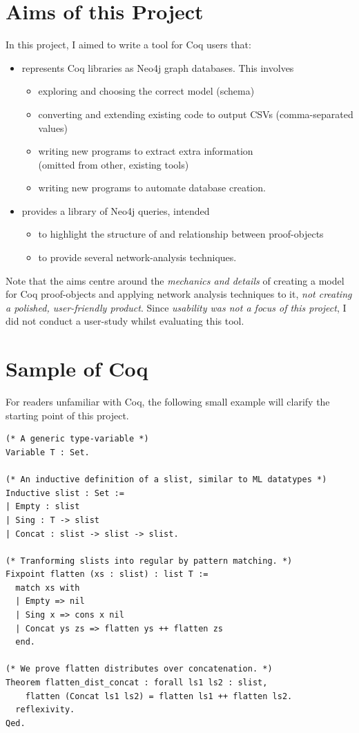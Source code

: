 \section{Aims of this Project}\label{intro:aims}

In this project, I aimed to write a tool for Coq users that:

\begin{itemize}
\item represents Coq libraries as Neo4j graph databases. This involves
  \begin{itemize}
    \item exploring and choosing the correct model (schema)
  \item converting and extending existing code to output CSVs (comma-separated values)
  \item writing new programs to extract extra information \\
      (omitted from other, existing tools)
  \item writing new programs to automate database creation.
  \end{itemize}

\item provides a library of Neo4j queries, intended
  \begin{itemize}
  \item to highlight the structure of and relationship between proof-objects
  \item to provide several network-analysis techniques.
  \end{itemize}
\end{itemize}

Note that the aims centre around the \emph{mechanics and details} of creating a
model for Coq proof-objects and applying network analysis techniques to it,
\emph{not creating a polished, user-friendly product}. Since \emph{usability was
not a focus of this project}, I did not conduct a user-study whilst evaluating
this tool.

\section{Sample of Coq}

For readers unfamiliar with Coq, the following small example will clarify the
starting point of this project.

\begin{verbatim}
(* A generic type-variable *)
Variable T : Set.

(* An inductive definition of a slist, similar to ML datatypes *)
Inductive slist : Set :=
| Empty : slist
| Sing : T -> slist
| Concat : slist -> slist -> slist.

(* Tranforming slists into regular by pattern matching. *)
Fixpoint flatten (xs : slist) : list T :=
  match xs with
  | Empty => nil
  | Sing x => cons x nil
  | Concat ys zs => flatten ys ++ flatten zs
  end.

(* We prove flatten distributes over concatenation. *)
Theorem flatten_dist_concat : forall ls1 ls2 : slist,
    flatten (Concat ls1 ls2) = flatten ls1 ++ flatten ls2.
  reflexivity.
Qed.
\end{verbatim}

